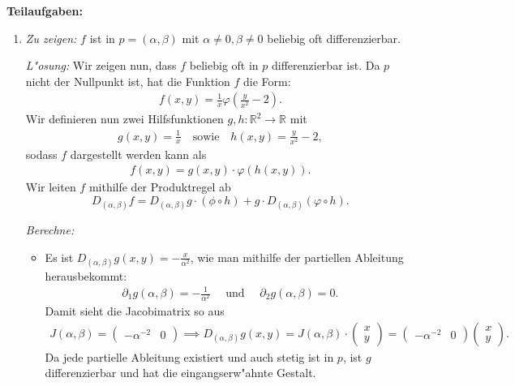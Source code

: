 \documentclass{article}
\newcommand{\R}{\mathbb{R}}
\def\doubleunderline#1{\underline{\underline{#1}}}
\begin{document}
\textbf{Teilaufgaben:}
\begin{enumerate}[label=(\roman*)]
    \item \textit{Zu zeigen:} $f$ ist in $p = (\alpha,\beta)$ mit $\alpha \neq 0, \beta \neq 0$ beliebig oft differenzierbar.
    
    \textit{L"osung:} Wir zeigen nun, dass $f$ beliebig oft in $p$ differenzierbar ist. Da $p$ nicht der Nullpunkt ist, hat die Funktion $f$ die Form:
    \begin{align*}
        f(x,y) = \frac{1}{x}\varphi(\frac{y}{x^2}-2).
    \end{align*}
    Wir definieren nun zwei Hilfsfunktionen $g,h: \R^2 \to \R$ mit 
    \begin{align*}
        g(x,y) = \frac{1}{x} \quad \text{sowie} \quad h(x,y) = \frac{y}{x^2}-2,
    \end{align*}
    sodass $f$ dargestellt werden kann als 
    \begin{align*}
        f(x,y) = g(x,y) \cdot  \varphi(h(x,y)).
    \end{align*}
    Wir leiten $f$ mithilfe der Produktregel ab 
    \[
        D_{(\alpha,\beta)}f = D_{(\alpha,\beta)}g \cdot (\phi \circ h) + g \cdot D_{(\alpha,\beta)}(\varphi \circ h).
    \] 
    
    \textit{Berechne:}
    \begin{itemize}
        \item Es ist \doubleunderline{$D_{(\alpha,\beta)}g(x,y) = -\frac{x}{\alpha^2}$}, wie man mithilfe der partiellen Ableitung herausbekommt:
        \begin{align*}
            \partial_1 g(\alpha,\beta) = - \frac{1}{\alpha^2} \quad \text{ und } \quad \partial_2 g(\alpha,\beta) = 0.
        \end{align*}
        Damit sieht die Jacobimatrix so aus
        \begin{align*}
            J(\alpha,\beta) = 
            \begin{pmatrix}
                -\alpha^{-2} & 0
            \end{pmatrix} \implies D_{(\alpha,\beta)}g(x,y) = J(\alpha,\beta) \cdot \begin{pmatrix}x \\ y\end{pmatrix} = 
            \begin{pmatrix}
                -\alpha^{-2} & 0
            \end{pmatrix}
            \begin{pmatrix}x \\ y\end{pmatrix}.
        \end{align*}
        Da jede partielle Ableitung existiert und auch stetig ist in $p$, ist $g$ differenzierbar und hat die eingangserw"ahnte Gestalt.
        

\end{itemize}
\end{enumerate}
\end{document}
